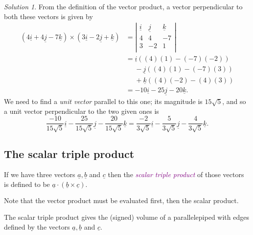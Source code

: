 \documentclass[
  english,
  11pt,
  oneside]{book}
\newcommand{\slide}{}
\theoremstyle{definition}
\theoremstyle{definition}
\theoremstyle{definition}
\theoremstyle{definition}
\theoremstyle{remark}
\newtheorem*{solution}{Solution}
\begin{document}
\begin{solution}
From the definition of the vector product, a vector perpendicular to both these vectors is given by
\begin{align*}
(4\underline i+4\underline j-7\underline k) \times(3\underline i - 2\underline j+\underline k)& = \left|\begin{array}{ccc}\underline i&\underline j&\underline k\\4&4&-7\\3&-2&1\\\end{array}\right|\\
&= \underline i((4)(1)-(-7)(-2))\\
&\phantom{= }-\underline j((4)(1)-(-7)(3))\\
&\phantom{= }+\underline k((4)(-2)-(4)(3))\\
&=-10\underline i-25\underline j-20\underline k.
\end{align*}
We need to find a \emph{unit vector} parallel to this one; its magnitude is \(15\sqrt{5}\), and so a unit vector perpendicular to the two given ones is
\[\frac{-10}{15\sqrt{5}}\underline i-\frac{25}{15\sqrt{5}}\underline j-\frac{20}{15\sqrt{5}}\underline k = \frac{-2}{3\sqrt{5}}\underline i-\frac{5}{3\sqrt{5}}\underline j-\frac{4}{3\sqrt{5}}\underline k.\]
\end{solution}

\begin{slidesonly}

\slide

\hbox{}
\slide

\end{slidesonly}

\subsection{The scalar triple product}\label{the-scalar-triple-product}

If we have three vectors \(\underline a, \underline b\) and \(\underline c\) then the \textcolor{purple}{\em scalar triple product} of those vectors is defined to be \(\underline a \cdot(\underline b\times\underline c)\).

Note that the vector product must be evaluated first, then the scalar product.

The scalar triple product gives the (signed) volume of a parallelepiped with edges defined by the vectors \(\underline a, \underline b\) and \(\underline c\).
\end{document}
